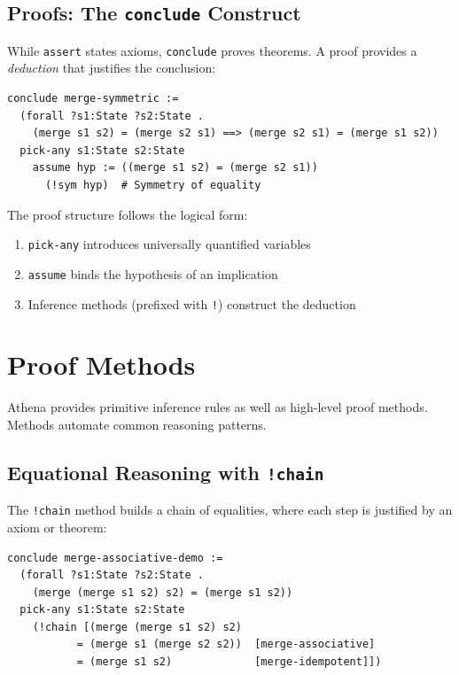 \subsection{Proofs: The \texttt{conclude} Construct}

While \lstinline{assert} states axioms, \lstinline{conclude} proves theorems. A proof provides a \emph{deduction} that justifies the conclusion:

\begin{lstlisting}[language=Athena,style=athena,caption={Basic proof structure}]
conclude merge-symmetric := 
  (forall ?s1:State ?s2:State . 
    (merge s1 s2) = (merge s2 s1) ==> (merge s2 s1) = (merge s1 s2))
  pick-any s1:State s2:State
    assume hyp := ((merge s1 s2) = (merge s2 s1))
      (!sym hyp)  # Symmetry of equality
\end{lstlisting}

The proof structure follows the logical form:
\begin{enumerate}
  \item \lstinline{pick-any} introduces universally quantified variables
  \item \lstinline{assume} binds the hypothesis of an implication
  \item Inference methods (prefixed with \lstinline{!}) construct the deduction
\end{enumerate}

\section{Proof Methods}

Athena provides primitive inference rules as well as high-level proof methods. Methods automate common reasoning patterns.

\subsection{Equational Reasoning with \texttt{!chain}}

The \lstinline{!chain} method builds a chain of equalities, where each step is justified by an axiom or theorem:\\

\begin{lstlisting}[language=Athena,style=athena,caption={Equational chain proof}]
conclude merge-associative-demo := 
  (forall ?s1:State ?s2:State . 
    (merge (merge s1 s2) s2) = (merge s1 s2))
  pick-any s1:State s2:State
    (!chain [(merge (merge s1 s2) s2)
           = (merge s1 (merge s2 s2))  [merge-associative]
           = (merge s1 s2)             [merge-idempotent]])
\end{lstlisting}

